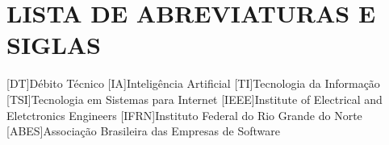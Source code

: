 \thispagestyle{empty}

\chapter*{\normalsize{\textbf{LISTA DE ABREVIATURAS E SIGLAS}}}



\begin{acronym}[]
    \hypersetup{colorlinks=true, linkcolor=black, urlcolor=black}
    [DT]{Débito Técnico}
    [IA]{Inteligência Artificial}
    [TI]{Tecnologia da Informação}
    [TSI]{Tecnologia em Sistemas para Internet}
    [IEEE]{Institute of Electrical and Eletctronics Engineers}
    [IFRN]{Instituto Federal do Rio Grande do Norte}
    [ABES]{Associação Brasileira das Empresas de Software}
\end{acronym}

\newpage
